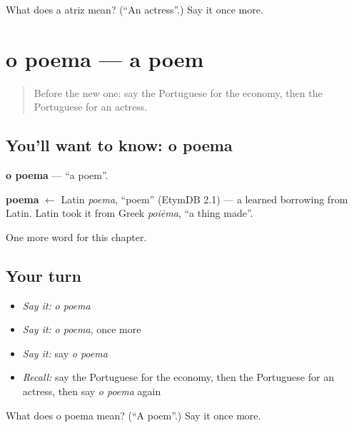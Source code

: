 \begin{tcolorbox}[breakable,colback=teal!4,colframe=teal!35!black,title={Before you move on}]
What does a atriz mean? (\textquotedblleft{}An actress\textquotedblright{}.) Say it once more.
\end{tcolorbox}
\section[o poema]{o poema — a poem}

\label{lesson:PT-C190-poema}



\begin{quote}
Before the new one: say the Portuguese for the economy, then the Portuguese for an actress.
\end{quote}

\subsection*{You'll want to know: o poema}
\textbf{o poema} — \textquotedblleft{}a poem\textquotedblright{}.

\begin{cousinweb}
\textbf{poema} $\leftarrow$ Latin \emph{poema}, \textquotedblleft{}poem\textquotedblright{} (EtymDB 2.1) — a learned borrowing from Latin. Latin took it from Greek \emph{poiēma}, \textquotedblleft{}a thing made\textquotedblright{}.
\end{cousinweb}

\begin{grammarlens}[title={What you've built}]
One more word for this chapter.
\end{grammarlens}

\subsection*{Your turn}
\begin{itemize}
\raggedright
  \item \emph{Say it:} \emph{o poema}
  \item \emph{Say it:} \emph{o poema}, once more
  \item \emph{Say it:} say \emph{o poema}
  \item \emph{Recall:} say the Portuguese for the economy, then the Portuguese for an actress, then say \emph{o poema} again
\end{itemize}

\begin{tcolorbox}[breakable,colback=teal!4,colframe=teal!35!black,title={Before you move on}]
What does o poema mean? (\textquotedblleft{}A poem\textquotedblright{}.) Say it once more.
\end{tcolorbox}
